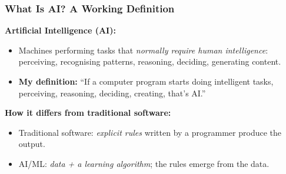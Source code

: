 
\begin{frame}[fragile]\frametitle{What Is AI? A Working Definition}
\textbf{Artificial Intelligence (AI):}
\begin{itemize}
\item Machines performing tasks that \textit{normally require human intelligence}: perceiving, recognising patterns, reasoning, deciding, generating content.
\item \textbf{My definition:} ``If a computer program starts doing intelligent tasks, perceiving, reasoning, deciding, creating, that's AI.''
\end{itemize}
\textbf{How it differs from traditional software:}
\begin{itemize}
\item Traditional software: \textit{explicit rules} written by a programmer produce the output.
\item AI/ML: \textit{data + a learning algorithm}; the rules emerge from the data.
\end{itemize}
\end{frame}

